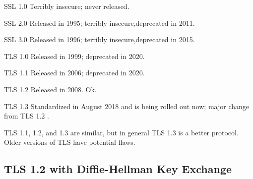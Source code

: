 \documentclass[11pt]{article} %
\begin{document}
\smallskip
{\parindent0pt SSL 1.0 Terribly insecure; never released.}

\smallskip
{\parindent0pt SSL 2.0 Released in 1995; terribly insecure,deprecated in 2011.}

\smallskip
{\parindent0pt SSL 3.0  Released in 1996; terribly insecure,deprecated in 2015.}

\smallskip
{\parindent0pt TLS 1.0 Released in 1999; deprecated in 2020.}

\smallskip
{\parindent0pt TLS 1.1 Released in 2006; deprecated in 2020.}

\smallskip
{\parindent0pt TLS 1.2 Released in 2008. Ok.}

\smallskip
{\parindent0pt TLS 1.3 Standardized in August 2018 and is being rolled out now;
major change from TLS 1.2 .}

TLS 1.1, 1.2,  and 1.3 are similar, but in general TLS 1.3 is a better protocol.
Older versions of TLS have potential flaws.

\subsection{TLS 1.2 with Diffie-Hellman Key Exchange}
\end{document}
